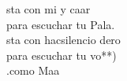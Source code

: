 \begin{cancion}%
	sta con mi y caar\\
	para escuchar tu Pala.\\
	sta con hacsilencio dero\\
	para escuchar tu vo**)\\
	.como Maa\\
\end{cancion}%

